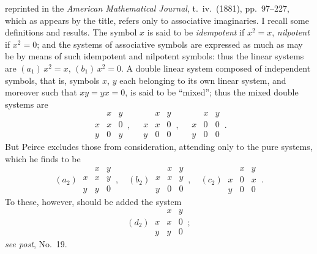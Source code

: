 \documentclass[11pt,a4paper]{article}
\begin{document}
\thispagestyle{plain}
\noindent reprinted in the \textit{American Mathematical Journal}, t.~iv.\ (1881), pp.~97--227, which as appears by the title, refers only to associative imaginaries.  I recall some definitions and results.  The symbol $x$ is said to be \textit{idempotent} if $x^{2} = x$, \textit{nilpotent} if $x^{2} = 0$; and the systems of associative symbols are expressed as much as may be by means of such idempotent and nilpotent symbols: thus the linear systems are $(a_{1})\,x^{2} = x$, $(b_{1})\,x^{2} = 0$.  A double linear system composed of independent symbols, that is, symbols $x$, $y$ each belonging to its own linear system, and moreover such that $xy = yx = 0$, is said to be ``mixed''; thus the mixed double systems are
\[
\begin{array}{c|cc} & x & y \\\hline x & x & 0 \\ y & 0 & y \end{array}\,,\quad
\begin{array}{c|cc} & x & y \\\hline x & x & 0 \\ y & 0 & 0 \end{array}\,,\quad
\begin{array}{c|cc} & x & y \\\hline x & 0 & 0 \\ y & 0 & 0 \end{array}\,.
\]
But Peirce excludes those from consideration, attending only to the pure systems, which he finds to be
\[
(a_{2})\ \begin{array}{c|cc} & x & y \\\hline x & x & y \\ y & y & 0 \end{array}\,,\quad
(b_{2})\ \begin{array}{c|cc} & x & y \\\hline x & x & y \\ y & 0 & 0 \end{array}\,,\quad
(c_{2})\ \begin{array}{c|cc} & x & y \\\hline x & 0 & x \\ y & 0 & 0 \end{array}\,.
\]
To these, however, should be added the system
\[
(d_{2})\ \begin{array}{c|cc} & x & y \\\hline x & x & 0 \\ y & y & 0 \end{array}\,;
\]
\textit{see post}, No.~19.
\end{document}
